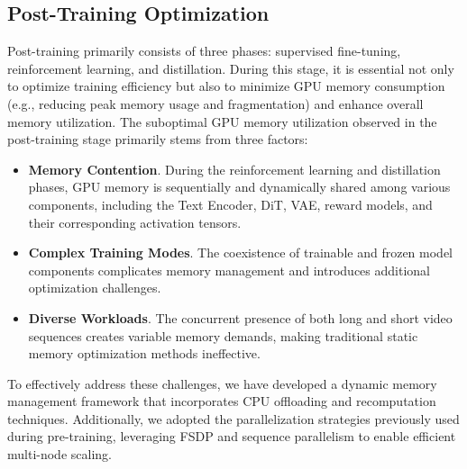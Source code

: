 \subsection{Post-Training Optimization}
Post-training primarily consists of three phases: supervised fine-tuning, reinforcement learning, and distillation. During this stage, it is essential not only to optimize training efficiency but also to minimize GPU memory consumption (e.g., reducing peak memory usage and fragmentation) and enhance overall memory utilization. The suboptimal GPU memory utilization observed in the post-training stage primarily stems from three factors:

\begin{itemize}
    \item \textbf{Memory Contention}. During the reinforcement learning and distillation phases, GPU memory is sequentially and dynamically shared among various components, including the Text Encoder, DiT, VAE, reward models, and their corresponding activation tensors.
    \item \textbf{Complex Training Modes}. The coexistence of trainable and frozen model components complicates memory management and introduces additional optimization challenges.
    \item \textbf{Diverse Workloads}. The concurrent presence of both long and short video sequences creates variable memory demands, making traditional static memory optimization methods ineffective.
\end{itemize}

To effectively address these challenges, we have developed a dynamic memory management framework that incorporates CPU offloading and recomputation techniques. Additionally, we adopted the parallelization strategies previously used during pre-training, leveraging FSDP and sequence parallelism to enable efficient multi-node scaling.


